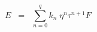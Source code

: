 \begin{equation}
E \;\; = \;\; \sum_{n=0}^{q} k_n \; \eta^n \tau^{n+1} F
\label{eq:x2a}
\end{equation}

